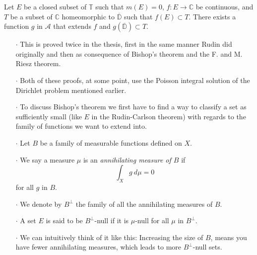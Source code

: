 \documentclass{beamer}
\begin{document}
\begin{frame}
\begin{theorem}
Let
	$E$ be a closed subset of $\mathbb{T}$ such that $m(E) = 0$,
	$f \colon E \rightarrow \mathbb{C}$ be continuous,
	and $T$ be a subset of $\mathbb{C}$ homeomorphic to $\overline{\mathbb{D}}$ such that $f(E) \subset T$.
There exists a function $g$ in $\mathcal{A}$ that extends $f$ and $g(\overline{\mathbb{D}}) \subset T$.
\end{theorem}
\end{frame}

\begin{frame}
\begin{enumerate}
\item[$\cdot$] This is proved twice in the thesis, first in the same manner Rudin did originally and then as consequence of Bishop's theorem and the F. and M. Riesz theorem.
\item[$\cdot$] Both of these proofs, at some point, use the Poisson integral solution of the Dirichlet problem mentioned earlier.
\item[$\cdot$] To discuss Bishop's theorem we first have to find a way to classify a set as sufficiently small (like $E$ in the Rudin-Carlson theorem) with regards to the family of functions we want to extend into.
\end{enumerate}
\end{frame}

\begin{frame}
\begin{enumerate}
\item[$\cdot$] Let $B$ be a family of measurable functions defined on $X$.
\item[$\cdot$] We say a measure $\mu$ is an \emph{annihilating measure of $B$} if
\[
	\int_X g\ d\mu = 0
\]
for all $g$ in $B$.
\item[$\cdot$] We denote by $B^{\perp}$ the family of all the annihilating measures of $B$.
\item[$\cdot$] A set $E$ is said to be $B^{\perp}$-null if it is $\mu$-null for all $\mu$ in $B^{\perp}$.
\item[$\cdot$] We can intuitively think of it like this: Increasing the size of $B$, means you have fewer annihilating measures, which leads to more $B^{\perp}$-null sets.
\end{enumerate}
\end{frame}
\end{document}

